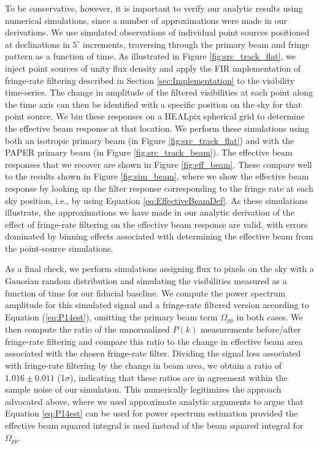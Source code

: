 \documentclass[twocolumn,apj,numberedappendix]{emulateapj}
\begin{document}
To be conservative, however, it is important to verify our analytic results using numerical
simulations, since a number of approximations were made in our derivations. We use simulated observations 
of individual point sources positioned at declinations in $5^\circ$ increments, traversing
through the primary beam and fringe pattern as a function of time.  As
illustrated in Figure \ref{fig:src_track_flat}, we inject point sources of unity
flux density and apply the FIR implementation of fringe-rate filtering described in Section \ref{sec:Implementation}
to the visibility time-series.  The change in amplitude of the filtered visibilities at each point
along the time axis can then be 
identified with a specific position on the sky for that point source.  We bin these responses on a
HEALpix spherical grid \citep{gorski_et_al2005} to determine the effective beam response
at that location.  We perform these simulations using both an isotropic primary beam (in Figure \ref{fig:src_track_flat})
and with the PAPER primary beam (in Figure \ref{fig:src_track_beam}).  
The effective beam responses that
we recover are shown in Figure \ref{fig:eff_beam}.  These compare well to the results shown in Figure \ref{fig:sim_beam}, 
where we show the effective beam response by looking up the filter response corresponding
to the fringe rate at each sky position, i.e., by using Equation \eqref{eq:EffectiveBeamDef}.  As these simulations illustrate, the approximations we have made in our analytic
derivation of the effect of fringe-rate filtering on the effective beam response are valid, with errors 
dominated by binning effects associated with determining the effective beam from the point-source simulations.

As a final check, we perform simulations assigning flux to pixels on the sky with a Gaussian random distribution
and simulating the visibilities measured as a function of time for our fiducial baseline.  We compute the
power spectrum amplitude for this simulated signal and a fringe-rate filtered version according to
Equation (\ref{eq:P14est}), omitting the primary beam term $\Omega_{pp}$ in both cases.  We then compute
the ratio of the unnormalized $P(k)$ measurements before/after fringe-rate filtering and compare 
this ratio to the change in effective
beam area associated with the chosen fringe-rate filter.  Dividing the signal loss associated with
fringe-rate filtering by the change in beam area, we obtain a ratio of $1.016\pm0.011$ (1$\sigma$), 
indicating that these ratios are in agreement 
within the sample noise of our simulation. This numerically legitimizes the approach advocated above, where
we used approximate analytic arguments to argue that Equation \eqref{eq:P14est} can be used for power spectrum estimation provided the effective beam
squared integral is used instead of the beam squared integral for $\Omega_{pp}$.
\end{document}
